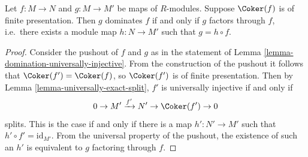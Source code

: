 \begin{lemma}
\label{lemma-domination}
Let $f: M \to N$ and $g: M \to M'$ be maps of $R$-modules.
Suppose $\Coker(f)$ is of finite presentation.  Then $g$ dominates $f$ if
and
only if $g$ factors through $f$, i.e.\ there exists a module map $h: N
\to M'$ such that $g = h \circ f$.
\end{lemma}

\begin{proof}
Consider the pushout of $f$ and $g$ as in the statement of
Lemma \ref{lemma-domination-universally-injective}.
From the construction of the pushout it follows that
$\Coker(f') = \Coker(f)$, so $\Coker(f')$ is of finite
presentation.  Then by
Lemma \ref{lemma-universally-exact-split}, $f'$ is universally injective if and
only if
$$
0 \to M' \xrightarrow{f'} N' \to \Coker(f') \to 0
$$
splits. This is the case if and only if there is a map $h' : N' \to M'$
such that $h' \circ f' = \text{id}_{M'}$.  From the universal
property of the pushout, the existence of such an $h'$ is equivalent to $g$
factoring through $f$.
\end{proof}
